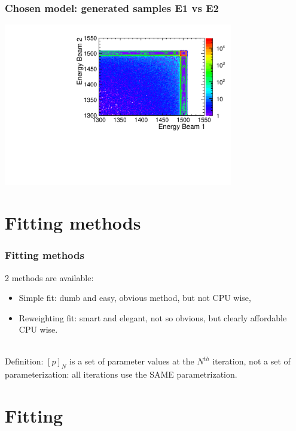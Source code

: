 \documentclass[handout]{beamer}
\begin{document}
\begin{frame}
\frametitle{Chosen model: generated samples E1 vs E2}
\includegraphics[width=10cm]{E1_vs_E2_gen}
\end{frame}


\section{Fitting methods}
\begin{frame}
\frametitle{Fitting methods}
2 methods are available:
\begin{itemize}
\item Simple fit: dumb and easy, obvious method, but not CPU wise,
\item Reweighting fit: smart and elegant, not so obvious, but clearly affordable CPU wise.
\end{itemize}
~\\
Definition: \alert{$[p]_N$ is a set of parameter values} at the $N^{th}$
iteration, not a set of parameterization: all iterations use the SAME parametrization.
\end{frame}
\section{Fitting}
\end{document}
